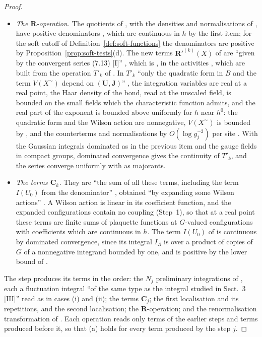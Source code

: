 \documentclass[11pt]{preprint}
\numberwithin{equation}{section}
\theoremstyle{definition}
\theoremstyle{remark}
\theoremstyle{plain}
\begin{document}
\begin{proof}
\begin{itemize}
\item \emph{The $\mathbf R$-operation.} The quotients of \cite[(0.3), (0.5), p.~176]{BalabanLFR1}, with the densities and normalisations of \cite[(1.100), p.~201]{BalabanLFR1}, have positive denominators \cite[p.~176]{BalabanLFR1}, which are continuous in $h$ by the first item; for the soft cutoff of Definition~\ref{def:soft-functions} the denominators are positive by Proposition~\ref{prop:soft-tests}(d). The new terms $\mathbf R'^{(k)}(X)$ of \cite[(1.98)--(1.100), p.~390]{BalabanLFR2} are ``given by the convergent series (7.13) [I]'' \cite[p.~390]{BalabanLFR2}, which is \cite[(2.13)]{BalabanRG2}, in the activities \cite[(1.91), p.~388]{BalabanLFR2}, which are built from the operation $T'_k$ of \cite[(1.71), p.~379]{BalabanLFR2}. In $T'_k$ ``only the quadratic form in $B$ and the term $V(X^\sim)$ depend on $(\mathbf U, \mathbf J)$'' \cite[p.~379]{BalabanLFR2}, the integration variables are real at a real point, the Haar density of the bond, read at the unscaled field, is bounded on the small fields which the characteristic function admits, and the real part of the exponent is bounded above uniformly for $h$ near $h^0$: the quadratic form and the Wilson action are nonnegative, $V(X^\sim)$ is bounded by \cite[(1.69), p.~377]{BalabanLFR2}, and the counterterms and normalisations by $O(\log g_j^{-2})$ per site \cite[p.~380]{BalabanLFR2}. With the Gaussian integrals dominated as in the previous item and the gauge fields in compact groups, dominated convergence gives the continuity of $T'_k$, and the series converge uniformly with \cite[(1.92)--(1.97), (1.99)--(1.100), pp.~388--390]{BalabanLFR2} as majorants.
\item \emph{The terms $\mathbf C_k$.} They are ``the sum of all these terms, including the term $I(U_0)$ from the denominator'' \cite[p.~369]{BalabanLFR2}, obtained ``by expanding some Wilson actions'' \cite[p.~369]{BalabanLFR2}. A Wilson action is linear in its coefficient function, and the expanded configurations contain no coupling (Step~1), so that at a real point these terms are finite sums of plaquette functions at $G$-valued configurations with coefficients which are continuous in $h$. The term $I(U_0)$ of \cite[(1.10), p.~358]{BalabanLFR2} is continuous by dominated convergence, since its integral $I_\Lambda$ is over a product of copies of $G$ of a nonnegative integrand bounded by one, and is positive by the lower bound of \cite[p.~358]{BalabanLFR2}.
\end{itemize}
The step produces its terms in the order: the $N_j$ preliminary integrations of \cite[pp.~188--189]{BalabanLFR1}, each a fluctuation integral ``of the same type as the integral studied in Sect.~3 [III]'' \cite[p.~189]{BalabanLFR1} read as in cases (i) and (ii); the terms $\mathbf C_j$; the first localisation and its repetitions, and the second localisation; the $\mathbf R$-operation; and the renormalisation transformation of \cite[Sect.~3]{BalabanCRE}. Each operation reads only terms of the earlier steps and terms produced before it, so that (a) holds for every term produced by the step $j$.


\end{proof}
\end{document}

